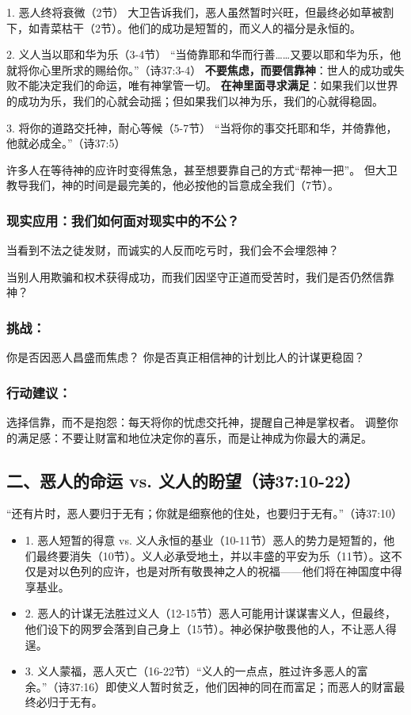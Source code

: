 \documentclass[a4paper, 12pt]{article}
\begin{document}
1. 恶人终将衰微（2节）
大卫告诉我们，恶人虽然暂时兴旺，但最终必如草被割下，如青菜枯干（2节）。他们的成功是短暂的，而义人的福分是永恒的。

2. 义人当以耶和华为乐（3-4节）
“当倚靠耶和华而行善……又要以耶和华为乐，他就将你心里所求的赐给你。”（诗37:3-4）
\textbf{不要焦虑，而要信靠神}：世人的成功或失败不能决定我们的命运，唯有神掌管一切。
\textbf{在神里面寻求满足}：如果我们以世界的成功为乐，我们的心就会动摇；但如果我们以神为乐，我们的心就得稳固。

3. 将你的道路交托神，耐心等候（5-7节）
“当将你的事交托耶和华，并倚靠他，他就必成全。”（诗37:5）

许多人在等待神的应许时变得焦急，甚至想要靠自己的方式“帮神一把”。
但大卫教导我们，神的时间是最完美的，他必按他的旨意成全我们（7节）。
\subsubsection*{现实应用：我们如何面对现实中的不公？}
\hspace{0.6cm}当看到不法之徒发财，而诚实的人反而吃亏时，我们会不会埋怨神？

当别人用欺骗和权术获得成功，而我们因坚守正道而受苦时，我们是否仍然信靠神？
\subsubsection*{挑战：}

你是否因恶人昌盛而焦虑？
你是否真正相信神的计划比人的计谋更稳固？
\subsubsection*{行动建议：}

选择信靠，而不是抱怨：每天将你的忧虑交托神，提醒自己神是掌权者。
调整你的满足感：不要让财富和地位决定你的喜乐，而是让神成为你最大的满足。
\subsection*{二、恶人的命运 vs. 义人的盼望（诗37:10-22）}
“还有片时，恶人要归于无有；你就是细察他的住处，也要归于无有。”（诗37:10）
\begin{itemize}
    \item 1. 恶人短暂的得意 vs. 义人永恒的基业（10-11节）恶人的势力是短暂的，他们最终要消失（10节）。义人必承受地土，并以丰盛的平安为乐（11节）。这不仅是对以色列的应许，也是对所有敬畏神之人的祝福——他们将在神国度中得享基业。
    \item 2. 恶人的计谋无法胜过义人（12-15节）恶人可能用计谋谋害义人，但最终，他们设下的网罗会落到自己身上（15节）。神必保护敬畏他的人，不让恶人得逞。

    \item 3. 义人蒙福，恶人灭亡（16-22节）“义人的一点点，胜过许多恶人的富余。”（诗37:16）即使义人暂时贫乏，他们因神的同在而富足；而恶人的财富最终必归于无有。

\end{itemize}
\end{document}
